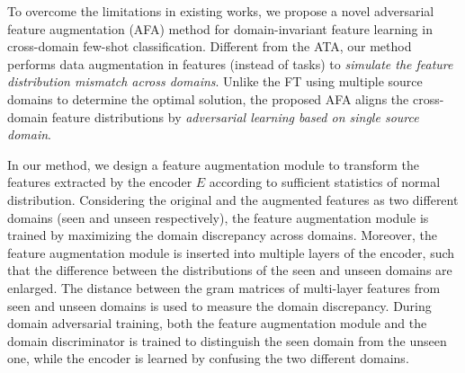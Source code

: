 \documentclass[runningheads]{utils/llncs}
\begin{document}
To overcome the limitations in existing works, we propose a novel adversarial feature augmentation (AFA) method for domain-invariant feature learning in cross-domain few-shot classification.
Different from the ATA, our method performs data augmentation in features (instead of tasks) to \textit{simulate the feature distribution mismatch across domains}.
Unlike the FT using multiple source domains to determine the optimal solution, the proposed AFA aligns the cross-domain feature distributions by \textit{adversarial learning based on single source domain}.


In our method, we design a feature augmentation module to transform the features extracted by the encoder $E$ according to sufficient statistics of normal distribution.
Considering the original and the augmented features as two different domains (seen and unseen respectively), the feature augmentation module is trained by maximizing the domain discrepancy across domains.
Moreover, the feature augmentation module is inserted into multiple layers of the encoder, such that the difference between the distributions of the seen and unseen domains are enlarged.
The distance between the gram matrices of multi-layer features from seen and unseen domains is used to measure the domain discrepancy.
During domain adversarial training, both the feature augmentation module and the domain discriminator is trained to distinguish the seen domain from the unseen one, while the encoder is learned by confusing the two different domains.
\end{document}
